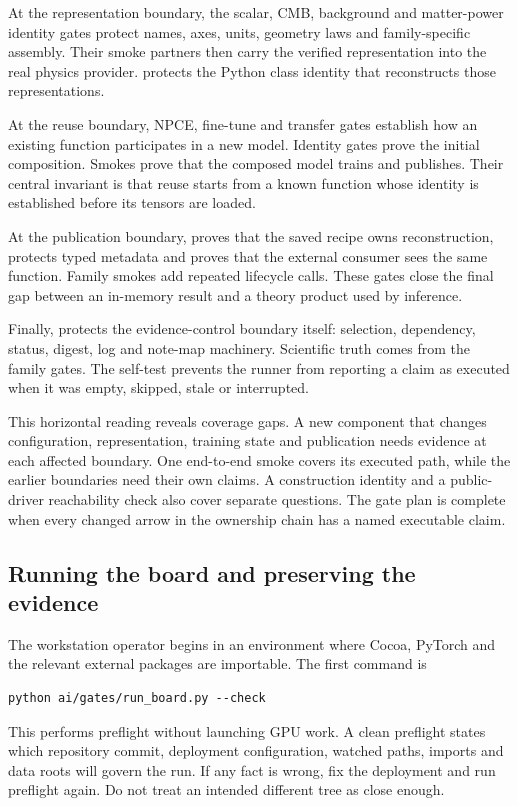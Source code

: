 At the representation boundary, the scalar, CMB, background and matter-power
identity gates protect names, axes, units, geometry laws and family-specific
assembly.  Their smoke partners then carry the verified representation into
the real physics provider.   protects the Python class identity
that reconstructs those representations.

At the reuse boundary, NPCE, fine-tune and transfer gates establish how an
existing function participates in a new model.  Identity gates prove the
initial composition.  Smokes prove that the composed model trains and
publishes.  Their central invariant is that reuse starts from a known function
whose identity is established before its tensors are loaded.

At the publication boundary,  proves that the saved
recipe owns reconstruction,  protects typed metadata
and  proves that the external consumer sees the same
function.  Family smokes add repeated
lifecycle calls.  These gates close the final gap between an in-memory result
and a theory product used by inference.

Finally,  protects the evidence-control boundary itself:
selection, dependency, status, digest, log and note-map machinery.  Scientific
truth comes from the family gates.  The self-test prevents the runner from
reporting a claim as executed when it was empty, skipped, stale or interrupted.

This horizontal reading reveals coverage gaps.  A new component that changes
configuration, representation, training state and publication needs evidence
at each affected boundary.  One end-to-end smoke covers its executed path,
while the earlier boundaries need their own claims.  A construction identity
and a public-driver reachability check also cover separate questions.  The
gate plan is complete when every changed arrow in the ownership chain has a
named executable claim.

\subsection{Running the board and preserving the evidence}

The workstation operator begins in an environment where Cocoa, PyTorch and
the relevant external packages are importable.  The first command is
\begin{verbatim}
python ai/gates/run_board.py --check
\end{verbatim}
This performs preflight without launching GPU work.  A clean preflight states
which repository commit, deployment configuration, watched paths, imports and
data roots will govern the run.  If any fact is wrong, fix the deployment and
run preflight again.  Do not treat an intended different tree as close enough.


